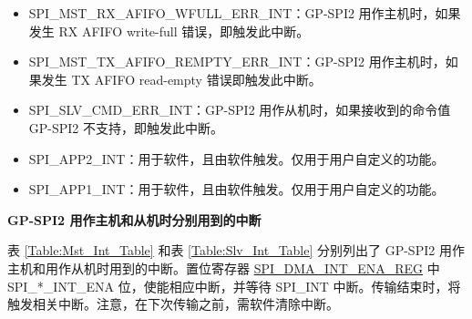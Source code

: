 \documentclass[main\_\_CN.tex]{subfiles}
\begin{document}
\begin{itemize}
\item \label{int:SPIMSTRXAFIFOWFULLERRINT}
SPI\_MST\_RX\_AFIFO\_WFULL\_ERR\_INT：GP-SPI2 用作主机时，如果发生 RX AFIFO write-full 错误，即触发此中断。

\item \label{int:SPIMSTTXAFIFOREMPTYERRINT}
SPI\_MST\_TX\_AFIFO\_REMPTY\_ERR\_INT：GP-SPI2 用作主机时，如果发生 TX AFIFO read-empty 错误即触发此中断。

\item \label{int:SPISLVCMDERRINT} SPI\_SLV\_CMD\_ERR\_INT：GP-SPI2 用作从机时，如果接收到的命令值 GP-SPI2 不支持，即触发此中断。

\item \label{int:SPIAPP2INT}SPI\_APP2\_INT：用于软件，且由软件触发。仅用于用户自定义的功能。
\item \label{int:SPIAPP1INT}SPI\_APP1\_INT：用于软件，且由软件触发。仅用于用户自定义的功能。

\end{itemize}

\textbf{GP-SPI2 用作主机和从机时分别用到的中断}

表  \ref{Table:Mst_Int_Table} 和表 \ref{Table:Slv_Int_Table} 分别列出了 GP-SPI2 用作主机和用作从机时用到的中断。置位寄存器 \hyperref[regdesc:SPIDMAINTENAREG]{SPI\_DMA\_INT\_ENA\_REG} 中SPI\_*\_INT\_ENA 位，使能相应中断，并等待 SPI\_INT 中断。传输结束时，将触发相关中断。注意，在下次传输之前，需软件清除中断。
\end{document}
